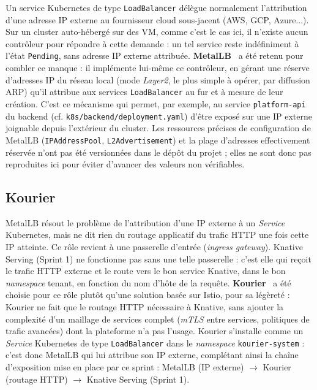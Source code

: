 Un service Kubernetes de type \texttt{LoadBalancer} délègue normalement l'attribution d'une adresse IP externe au fournisseur cloud sous-jacent (AWS, GCP, Azure...). Sur un cluster auto-hébergé sur des VM, comme c'est le cas ici, il n'existe aucun contrôleur pour répondre à cette demande : un tel service reste indéfiniment à l'état \texttt{Pending}, sans adresse IP externe attribuée. \textbf{MetalLB}~\citep{MetalLBDoc} a été retenu pour combler ce manque : il implémente lui-même ce contrôleur, en gérant une réserve d'adresses IP du réseau local (mode \textit{Layer2}, le plus simple à opérer, par diffusion ARP) qu'il attribue aux services \texttt{LoadBalancer} au fur et à mesure de leur création. C'est ce mécanisme qui permet, par exemple, au service \texttt{platform-api} du backend (cf. \texttt{k8s/backend/deployment.yaml}) d'être exposé sur une IP externe joignable depuis l'extérieur du cluster. Les ressources précises de configuration de MetalLB (\texttt{IPAddressPool}, \texttt{L2Advertisement}) et la plage d'adresses effectivement réservée n'ont pas été versionnées dans le dépôt du projet ; elles ne sont donc pas reproduites ici pour éviter d'avancer des valeurs non vérifiables.

\subsection{Kourier}

MetalLB résout le problème de l'attribution d'une IP externe à un \textit{Service} Kubernetes, mais ne dit rien du routage applicatif du trafic HTTP une fois cette IP atteinte. Ce rôle revient à une passerelle d'entrée (\textit{ingress gateway}). Knative Serving (Sprint 1) ne fonctionne pas sans une telle passerelle : c'est elle qui reçoit le trafic HTTP externe et le route vers le bon service Knative, dans le bon \textit{namespace} tenant, en fonction du nom d'hôte de la requête. \textbf{Kourier}~\citep{KourierDoc} a été choisie pour ce rôle plutôt qu'une solution basée sur Istio, pour sa légèreté : Kourier ne fait que le routage HTTP nécessaire à Knative, sans ajouter la complexité d'un maillage de services complet (\textit{mTLS} entre services, politiques de trafic avancées) dont la plateforme n'a pas l'usage. Kourier s'installe comme un \textit{Service} Kubernetes de type \texttt{LoadBalancer} dans le \textit{namespace} \texttt{kourier-system} : c'est donc MetalLB qui lui attribue son IP externe, complétant ainsi la chaîne d'exposition mise en place par ce sprint : MetalLB (IP externe) $\rightarrow$ Kourier (routage HTTP) $\rightarrow$ Knative Serving (Sprint 1).

